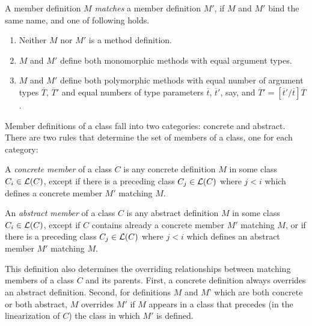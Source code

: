 \documentclass[a4paper,11pt,twoside]{article}
\begin{document}
\begin{definition}
A member definition $M$ {\em matches} a member definition $M'$, if $M$
and $M'$ bind the same name, and one of following holds.
\begin{enumerate}
\item Neither $M$ nor $M'$ is a method definition.
\item $M$ and $M'$ define both monomorphic methods with equal argument types.
\item $M$ and $M'$ define both polymorphic methods with 
equal number of argument types $\overline T$, $\overline T'$
and equal numbers of type parameters
$\overline t$, $\overline t'$, say, and $\overline T' = [\overline t'/\overline t]\overline T$.
\end{enumerate}
\end{definition}
Member definitions of a class fall into two categories: concrete and
abstract.  There are two rules that determine the set of members of a
class, one for each category:

\begin{definition}\label{def:member}
A {\em concrete member} of a class $C$ is any concrete definition $M$ in
some class $C_i \in {\cal L}(C)$, except if there is a preceding class $C_j
\in {\cal L}(C)$ where $j < i$ which defines a concrete member $M'$ matching $M$.  

An {\em abstract member} of a class $C$ is any abstract definition $M$
in some class $C_i \in {\cal L}(C)$, except if $C$ contains already a
concrete member $M'$ matching $M$, or if there is a preceding class
$C_j \in {\cal L}(C)$ where $j < i$ which defines an abstract member $M'$ matching
$M$.
\end{definition}
This definition also determines the overriding relationships between
matching members of a class $C$ and its parents.  First, a concrete
definition always overrides an abstract definition.  Second, for
definitions $M$ and $M$' which are both concrete or both abstract, $M$
overrides $M'$ if $M$ appears in a class that precedes (in the
linearization of $C$) the class in which $M'$ is defined.
\end{document}
